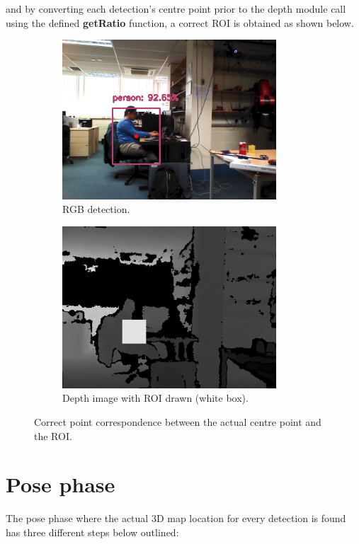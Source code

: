 and by converting each detection's centre point prior to the depth module call using the defined \textbf{getRatio} function, a correct ROI is obtained as shown below.

\begin{figure}[H]
	\centering
    \begin{subfigure}{.5\textwidth}
      \centering
      \includegraphics[width=8cm]{images/chapter4_rgb_ratio.png}
      \caption{RGB detection.}
      \label{fig:ratin}
    \end{subfigure}%
    
    \begin{subfigure}{.5\textwidth}
      \centering
      \includegraphics[width=8cm]{images/chapter4_rgbd_ratio.png}
      \caption{Depth image with ROI drawn (white box).}
      \label{fig:ration}
    \end{subfigure}%
    
    \caption{Correct point correspondence between the actual centre point and the ROI.}
\end{figure}

\section{Pose phase}

The pose phase where the actual 3D map location for every detection is found has three different steps below outlined:

